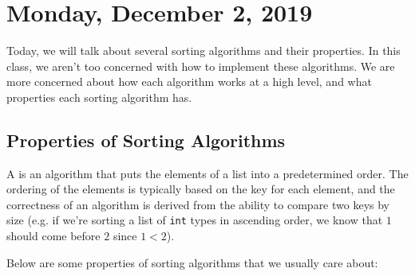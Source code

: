 \section{Monday, December 2, 2019}

Today, we will talk about several sorting algorithms and their properties. In this class, we aren't too concerned with how to implement these algorithms. We are more concerned about how each algorithm works at a high level, and what properties each sorting algorithm has.

\subsection{Properties of Sorting Algorithms}


A  is an algorithm that puts the elements of a list into a predetermined order. The ordering of the elements is typically based on the key for each element, and the correctness of an algorithm is derived from the ability to compare two keys by size (e.g. if we're sorting a list of \verb!int! types in ascending order, we know that $1$ should come before $2$ since $1 < 2$). 

Below are some properties of sorting algorithms that we usually care about:

